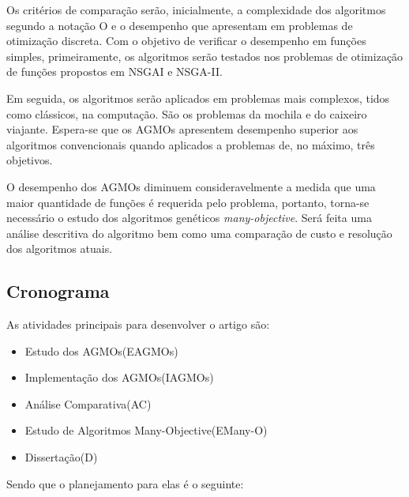 \documentclass[]{article}
\begin{document}
	Os critérios de comparação serão, inicialmente, a complexidade dos algoritmos segundo a notação O e o desempenho que apresentam em problemas de otimização discreta. Com o objetivo de verificar o desempenho em funções simples, primeiramente, os algoritmos serão testados nos problemas de otimização de funções propostos em NSGAI\cite{NSGAI} e NSGA-II\cite{NSGAII}.
	
	Em seguida, os algoritmos serão aplicados em problemas mais complexos, tidos como clássicos, na computação. São os problemas da mochila e do caixeiro viajante. Espera-se que os AGMOs apresentem desempenho superior aos algoritmos convencionais quando aplicados a problemas de, no máximo, três objetivos.
	
	O desempenho dos AGMOs diminuem consideravelmente a medida que uma maior quantidade de funções é requerida pelo problema, portanto, torna-se necessário o estudo dos algoritmos genéticos \textit{many-objective}. Será feita uma análise descritiva do algoritmo bem como uma comparação de custo e resolução dos algoritmos atuais.
	
\subsection{Cronograma}

	As atividades principais para desenvolver o artigo são:
	
\begin{itemize}
	\item Estudo dos AGMOs(EAGMOs)
	\item Implementação dos AGMOs(IAGMOs) 
	\item Análise Comparativa(AC)
	\item Estudo de Algoritmos Many-Objective(EMany-O)
	\item Dissertação(D)
\end{itemize}
	
	Sendo que o planejamento para elas é o seguinte:
	
\end{document}
